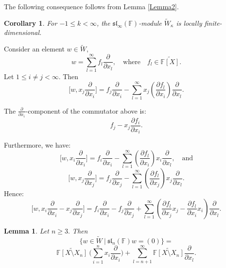 \documentclass[12pt,a4paper]{amsart}
\theoremstyle{plain}
\newtheorem{Lemma}{Lemma}
\newtheorem{Corollary}{Corollary}
\begin{document}
	The following consequence follows from Lemma \ref{Lemma2}.
	
	\begin{Corollary}\label{cor1} For  $-1  \leq k < \infty$, the $\mathfrak{sl}_\infty(\mathbb{F})$-module $\widetilde{W}_\kappa$ is locally finite-dimensional. \end{Corollary}
	
	Consider an element $w \in \widetilde{W}$,
	\[
	w = \sum_{l=1}^{\infty} f_l \frac{\partial}{\partial x_l}, \quad \text{where} \quad f_l \in \widetilde{\mathbb{F}[X]}.
	\]
	Let $1 \leq i \not= j < \infty$. Then
	\begin{equation}\label{eq2}
		\Big[w, x_j \frac{\partial}{\partial x_i}\Big] = f_j \frac{\partial}{\partial x_i} - \sum_{l=1}^{\infty} x_j \left(\frac{\partial f_l}{\partial x_i} \right) \frac{\partial}{\partial x_l}.
	\end{equation}
	
	The $\frac{\partial}{\partial x_i}$-component of the commutator above is:
	\begin{equation}\label{eq3}
		f_j - x_j \frac{\partial f_i}{\partial x_i}.
	\end{equation}
	
	Furthermore, we have:
	\[
	\Big[w, x_i \frac{\partial}{\partial x_i}\Big] = f_i \frac{\partial}{\partial x_i} - \sum_{l=1}^{\infty} \left(\frac{\partial f_l}{\partial x_i} \right) x_i \frac{\partial}{\partial x_l}, \quad \text{and}
	\]
	\[
	\Big[w, x_j \frac{\partial}{\partial x_j}\Big] = f_j \frac{\partial}{\partial x_j} - \sum_{l=1}^{\infty} \left(\frac{\partial f_l}{\partial x_j} \right) x_j \frac{\partial}{\partial x_l}.
	\] Hence:
	\begin{equation}\label{eq4}
		\Big[w, x_i \frac{\partial}{\partial x_i} - x_j \frac{\partial}{\partial x_j}\Big] = f_i \frac{\partial}{\partial x_i} - f_j \frac{\partial}{\partial x_j} + \sum_{l=1}^{\infty} \left(\frac{\partial f_l}{\partial x_j} x_j - \frac{\partial f_l}{\partial x_i} x_i \right) \frac{\partial}{\partial x_l}.
	\end{equation}
	
	
	
	
	
	\begin{Lemma}\label{Lemma3}  Let $n\geq 3.$ Then $$\Big\{w \in \widetilde{W} \ \Big|\  \mathfrak{sl}_n(\mathbb{F}) w = (0) \Big\} = $$ $$\widetilde{\mathbb{F}[X \setminus X_n]} \ \Bigg(\sum_{i=1}^{n} x_i \frac{\partial}{\partial x_i}\Bigg) + \sum_{l=n+1}^{\infty} \widetilde{\mathbb{F}[X \setminus X_n]} \frac{\partial}{\partial x_l}.$$ \end{Lemma}
	
\end{document}
